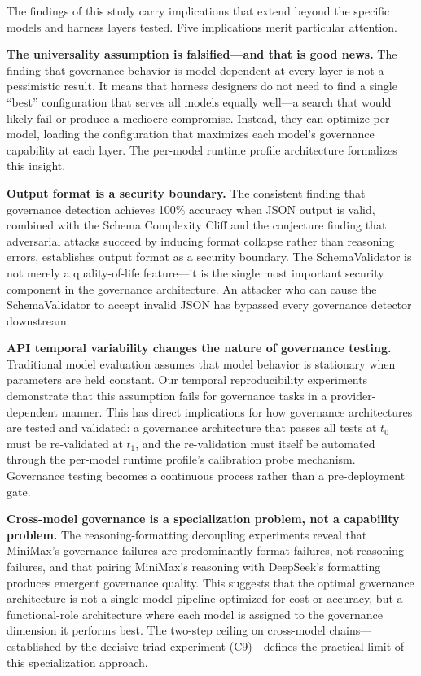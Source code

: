 \documentclass[11pt,a4paper]{article}
\begin{document}
The findings of this study carry implications that extend beyond the specific models and harness layers tested. Five implications merit particular attention.

\textbf{The universality assumption is falsified---and that is good news.} The finding that governance behavior is model-dependent at every layer is not a pessimistic result. It means that harness designers do not need to find a single ``best'' configuration that serves all models equally well---a search that would likely fail or produce a mediocre compromise. Instead, they can optimize per model, loading the configuration that maximizes each model's governance capability at each layer. The per-model runtime profile architecture formalizes this insight.

\textbf{Output format is a security boundary.} The consistent finding that governance detection achieves 100\% accuracy when JSON output is valid, combined with the Schema Complexity Cliff and the conjecture finding that adversarial attacks succeed by inducing format collapse rather than reasoning errors, establishes output format as a security boundary. The SchemaValidator is not merely a quality-of-life feature---it is the single most important security component in the governance architecture. An attacker who can cause the SchemaValidator to accept invalid JSON has bypassed every governance detector downstream.

\textbf{API temporal variability changes the nature of governance testing.} Traditional model evaluation assumes that model behavior is stationary when parameters are held constant. Our temporal reproducibility experiments demonstrate that this assumption fails for governance tasks in a provider-dependent manner. This has direct implications for how governance architectures are tested and validated: a governance architecture that passes all tests at $t_0$ must be re-validated at $t_1$, and the re-validation must itself be automated through the per-model runtime profile's calibration probe mechanism. Governance testing becomes a continuous process rather than a pre-deployment gate.

\textbf{Cross-model governance is a specialization problem, not a capability problem.} The reasoning-formatting decoupling experiments reveal that MiniMax's governance failures are predominantly format failures, not reasoning failures, and that pairing MiniMax's reasoning with DeepSeek's formatting produces emergent governance quality. This suggests that the optimal governance architecture is not a single-model pipeline optimized for cost or accuracy, but a functional-role architecture where each model is assigned to the governance dimension it performs best. The two-step ceiling on cross-model chains---established by the decisive triad experiment (C9)---defines the practical limit of this specialization approach.
\end{document}
